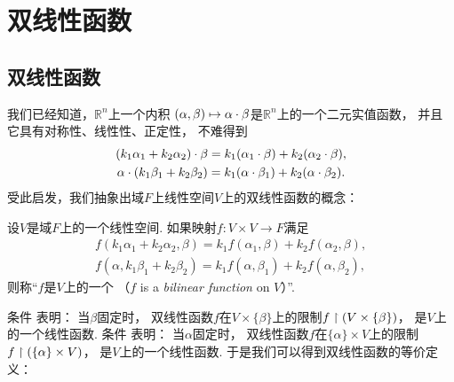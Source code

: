\section{双线性函数}
\subsection{双线性函数}
我们已经知道，\(\mathbb{R}^n\)上一个内积
\((\alpha,\beta) \mapsto \alpha\cdot\beta\)是\(\mathbb{R}^n\)上的一个二元实值函数，
并且它具有对称性、线性性、正定性，
不难得到\begin{gather*}
	(k_1\alpha_1+k_2\alpha_2)\cdot\beta
	= k_1(\alpha_1\cdot\beta)
	+ k_2(\alpha_2\cdot\beta), \\
	\alpha\cdot(k_1\beta_1+k_2\beta_2)
	= k_1(\alpha\cdot\beta_1)
	+ k_2(\alpha\cdot\beta_2).
\end{gather*}
受此启发，我们抽象出域\(F\)上线性空间\(V\)上的双线性函数的概念：
\begin{definition}\label{definition:双线性函数.双线性函数的定义1}
设\(V\)是域\(F\)上的一个线性空间.
如果映射\(f\colon V \times V \to F\)满足\begin{gather}
	f(k_1\alpha_1+k_2\alpha_2,\beta)
	= k_1 f(\alpha_1,\beta)
	+ k_2 f(\alpha_2,\beta),
		\label{equation:双线性函数.双线性函数判定条件1} \\
	f(\alpha,k_1\beta_1+k_2\beta_2)
	= k_1 f(\alpha,\beta_1)
	+ k_2 f(\alpha,\beta_2),
		\label{equation:双线性函数.双线性函数判定条件2}
\end{gather}
则称“\(f\)是\(V\)上的一个%
（\(f\) is a \emph{bilinear function} on \(V\)）”.
\end{definition}
条件  表明：
当\(\beta\)固定时，
双线性函数\(f\)在\(V \times \{\beta\}\)上的限制\(f \upharpoonright (V \times \{\beta\})\)，
是\(V\)上的一个线性函数.
条件  表明：
当\(\alpha\)固定时，
双线性函数\(f\)在\(\{\alpha\} \times V\)上的限制\(f \upharpoonright (\{\alpha\} \times V)\)，
是\(V\)上的一个线性函数.
于是我们可以得到双线性函数的等价定义：
